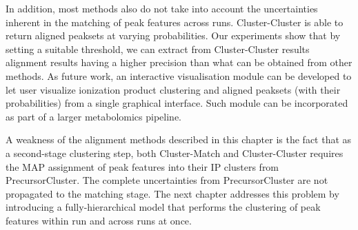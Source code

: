 In addition, most methods also do not take into account the uncertainties inherent in the matching of peak features across runs. Cluster-Cluster is able to return aligned peaksets at varying probabilities. Our experiments show that by setting a suitable threshold, we can extract from Cluster-Cluster results alignment results having a higher precision than what can be obtained from other methods. As future work, an interactive visualisation module can be developed to let user visualize ionization product clustering and aligned peaksets (with their probabilities) from a single graphical interface. Such module can be incorporated as part of a larger metabolomics pipeline.

A weakness of the alignment methods described in this chapter is the fact that as a second-stage clustering step, both Cluster-Match and Cluster-Cluster requires the MAP assignment of peak features into their IP clusters from PrecursorCluster. The complete uncertainties from PrecursorCluster are not propagated to the matching stage. The next chapter addresses this problem by introducing a fully-hierarchical model that performs the clustering of peak features within run and across runs at once.